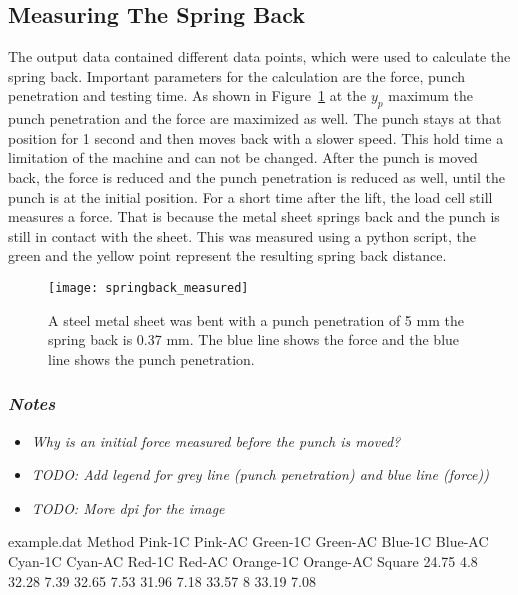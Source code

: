 \subsection{Measuring The Spring Back} \label{sec:measuring_the_spring_back}
The output data contained different data points, which were used to calculate the spring back.
Important parameters for the calculation are the force, punch penetration and testing time.
As shown in Figure~\ref{fig:springback_measured} at the $y_p$ maximum the punch penetration and the force are
maximized as well. The punch stays at that position for 1 second and then moves back with a slower speed. This hold
time a limitation of the machine and can not be changed.
After the punch is moved back, the force is reduced and the punch penetration is reduced as well, until the punch is
at the initial position. For a short time after the lift, the load cell still measures a force. That is because the
metal sheet springs back and the punch is still in contact with the sheet. This was measured using a python script,
the green and the yellow point represent the resulting spring back distance.

\begin{figure}[H]
    \centering
    \texttt{[image: springback\_measured]}
    \caption{A steel metal sheet was bent with a punch penetration of 5 mm the spring back is 0.37 mm. The blue line
    shows the force and the blue line shows the punch penetration.}
    \label{fig:springback_measured}
\end{figure}

\subsubsection*{\textit{Notes}}
\begin{itemize}
    \item \textit{Why is an initial force measured before the punch is moved?}
    \item \textit{TODO: Add legend for grey line (punch penetration) and blue line (force))}
    \item \textit{TODO: More dpi for the image}
\end{itemize}


\begin{filecontents*}{example.dat}
    Method Pink-1C Pink-AC Green-1C Green-AC Blue-1C Blue-AC Cyan-1C Cyan-AC Red-1C Red-AC Orange-1C Orange-AC
    Square 24.75 4.8 32.28 7.39 32.65 7.53 31.96 7.18 33.57 8 33.19 7.08
\end{filecontents*}


